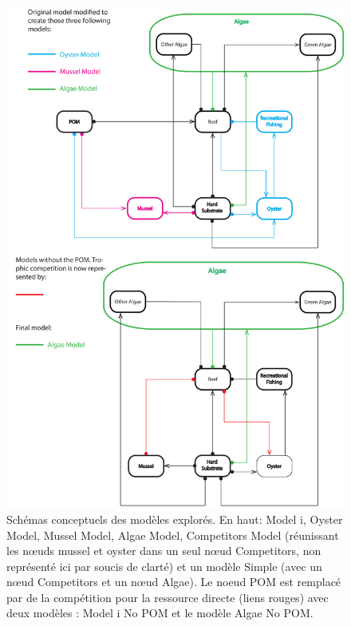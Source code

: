 \documentclass[12pt]{report}
\begin{document}
\begin{figure}[t]
    \centering
    \includegraphics[height = .5\textheight]{diagram_finaux.jpg}
    \caption[Schémas des différentes topologies du modèle testées dans cet étude]{Schémas conceptuels des  modèles explorés. En haut: Model i, Oyster Model, Mussel Model, Algae Model, Competitors Model (réunissant les nœuds mussel et oyster dans un seul nœud Competitors, non représenté ici par soucis de clarté) et un modèle Simple (avec un nœud Competitors et un nœud Algae). Le noeud POM est remplacé par de la compétition pour la ressource directe (liens rouges) avec deux modèles : Model i No POM et le modèle Algae No POM.}
    \label{fig:3}
\end{figure}
\end{document}
